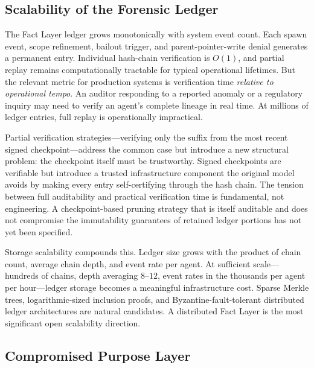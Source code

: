 \subsection{Scalability of the Forensic Ledger}
\label{sec:lim-scale}

The Fact Layer ledger grows monotonically with system event count. Each spawn event, scope refinement, bailout trigger, and parent-pointer-write denial generates a permanent entry. Individual hash-chain verification is $O(1)$, and partial replay remains computationally tractable for typical operational lifetimes. But the relevant metric for production systems is verification time \emph{relative to operational tempo}. An auditor responding to a reported anomaly or a regulatory inquiry may need to verify an agent's complete lineage in real time. At millions of ledger entries, full replay is operationally impractical.

Partial verification strategies---verifying only the suffix from the most recent signed checkpoint---address the common case but introduce a new structural problem: the checkpoint itself must be trustworthy. Signed checkpoints are verifiable but introduce a trusted infrastructure component the original model avoids by making every entry self-certifying through the hash chain. The tension between full auditability and practical verification time is fundamental, not engineering. A checkpoint-based pruning strategy that is itself auditable and does not compromise the immutability guarantees of retained ledger portions has not yet been specified.

Storage scalability compounds this. Ledger size grows with the product of chain count, average chain depth, and event rate per agent. At sufficient scale---hundreds of chains, depth averaging $8$--$12$, event rates in the thousands per agent per hour---ledger storage becomes a meaningful infrastructure cost. Sparse Merkle trees, logarithmic-sized inclusion proofs, and Byzantine-fault-tolerant distributed ledger architectures are natural candidates. A distributed Fact Layer is the most significant open scalability direction.

\subsection{Compromised Purpose Layer}
\label{sec:lim-purpose}

